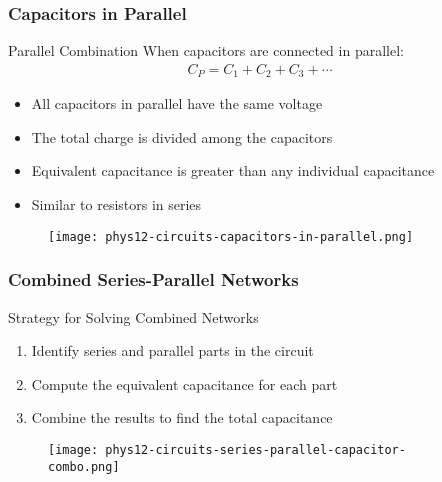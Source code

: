 \documentclass{beamer}
\begin{document}
\begin{frame}
    \frametitle{Capacitors in Parallel}
    
    \begin{block}{Parallel Combination}
        When capacitors are connected in parallel:
        \begin{align}
            C_P = C_1 + C_2 + C_3 + \cdots
        \end{align}
    \end{block}
    
    \begin{itemize}
        \item All capacitors in parallel have the same voltage
        \item The total charge is divided among the capacitors
        \item Equivalent capacitance is greater than any individual capacitance
        \item Similar to resistors in series
    \end{itemize}
    
    \begin{center}
   
      \begin{figure}
          \centering
          \texttt{[image: phys12-circuits-capacitors-in-parallel.png]}
      \end{figure}
    \end{center}
\end{frame}

\begin{frame}
    \frametitle{Combined Series-Parallel Networks}
    
    \begin{block}{Strategy for Solving Combined Networks}
        \begin{enumerate}
            \item Identify series and parallel parts in the circuit
            \item Compute the equivalent capacitance for each part
            \item Combine the results to find the total capacitance
        \end{enumerate}
    \end{block}
    
    \begin{center}
 \begin{figure}
        \centering
        \texttt{[image: phys12-circuits-series-parallel-capacitor-combo.png]}
    \end{figure}
    
        
    \end{center}
\end{frame}
\end{document}
